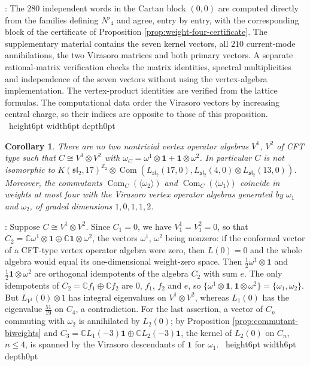 \documentclass[leqno]{article}
\newcommand{\Cbb}{\ensuremath{\mathbb{C}}}
\newcommand{\Z}{\ensuremath{\mathbb{Z}}}
\newcommand{\la}{\langle}
\newcommand{\ra}{\rangle}
\renewcommand{\leq}{\ensuremath{\leqslant}}
\newcommand{\qed}{\hfill \vrule height6pt  width6pt depth0pt}
\newcommand{\ot}{\otimes}
\newtheorem{cor}[thm]{Corollary}
\newenvironment{proof}[1][]{\noindent {\it Proof #1} : }{\hbox{~}\qed
\smallskip
}
\numberwithin{equation}{section}
\begin{document}
\begin{proof}
The $280$ independent words in the Cartan block $(0,0)$ are computed directly from the families defining $N'_4$ and agree, entry by entry, with the corresponding block of the certificate of Proposition \ref{prop:weight-four-certificate}. The supplementary material contains the seven kernel vectors, all $210$ current-mode annihilations, the two Virasoro matrices and both primary vectors. A separate rational-matrix verification checks the matrix identities, spectral multiplicities and independence of the seven vectors without using the vertex-algebra implementation. The vertex-product identities are verified from the lattice formulas. The computational data order the Virasoro vectors by increasing central charge, so their indices are opposite to those of this proposition.
\end{proof}

\begin{cor}
\label{cor:commutant-not-tensor}
There are no two nontrivial vertex operator algebras $V^1$, $V^2$ of CFT type such that $C \cong V^1 \ot V^2$ with $\omega_C = \omega^1 \ot \mathbf 1+\mathbf 1 \ot \omega^2$. In particular $C$ is not isomorphic to $K(\mathfrak{sl}_2,17)^{\Z_2} \ot \operatorname{Com}(L_{\mathfrak{sl}_2}(17,0), L_{\mathfrak{sl}_2}(4,0) \ot L_{\mathfrak{sl}_2}(13,0))$. Moreover, the commutants $\operatorname{Com}_C(\la\omega_2\ra)$ and $\operatorname{Com}_C(\la\omega_1\ra)$ coincide in weights at most four with the Virasoro vertex operator algebras generated by $\omega_1$ and $\omega_2$, of graded dimensions $1, 0, 1, 1, 2$.
\end{cor}

\begin{proof}
Suppose $C \cong V^1 \ot V^2$. Since $C_1 = 0$, we have $V^1_1 = V^2_1 = 0$, so that $C_2 = \Cbb \omega^1 \ot \mathbf 1 \oplus \Cbb \mathbf 1 \ot \omega^2$, the vectors $\omega^1$, $\omega^2$ being nonzero: if the conformal vector of a CFT-type vertex operator algebra were zero, then $L(0) = 0$ and the whole algebra would equal its one-dimensional weight-zero space. Then $\frac12\omega^1 \ot \mathbf 1$ and $\frac12\mathbf 1 \ot \omega^2$ are orthogonal idempotents of the algebra $C_2$ with sum $e$. The only idempotents of $C_2 = \Cbb f_1 \oplus \Cbb f_2$ are $0$, $f_1$, $f_2$ and $e$, so $\{\omega^1 \ot \mathbf 1, \mathbf 1 \ot \omega^2\} = \{\omega_1,\omega_2\}$. But $L_{V^1}(0) \ot 1$ has integral eigenvalues on $V^1 \ot V^2$, whereas $L_1(0)$ has the eigenvalue $\frac{51}{19}$ on $C_4$, a contradiction. For the last assertion, a vector of $C_n$ commuting with $\omega_2$ is annihilated by $L_2(0)$; by Proposition \ref{prop:commutant-biweights} and $C_3 = \Cbb L_1(-3)\mathbf 1 \oplus \Cbb L_2(-3)\mathbf 1$, the kernel of $L_2(0)$ on $C_n$, $n \leq 4$, is spanned by the Virasoro descendants of $\mathbf 1$ for $\omega_1$.
\end{proof}
\end{document}
